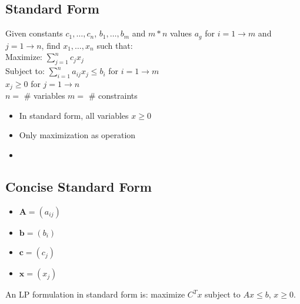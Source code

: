 \documentclass[12pt, letter]{article}
\begin{document}
\subsection*{Standard Form}
Given constants $c_1,\ldots,c_n$, $b_1,\ldots,b_m$ and $m*n$ values $a_g$ for $i=1\rightarrow m$ and $j=1\rightarrow n$, find $x_1,\ldots,x_n$ such that: \\
Maximize: $ \sum_{j=1}^{n} c_j x_j$ \\
Subject to: $ \sum_{i=1}^{n} a_{ij}x_j \le b_i$ for $i=1 \rightarrow m$ \\
 $x_j \ge 0$ for $j=1\rightarrow n$ \\
$n=$ \# variables
$m=$ \# constraints

\begin{itemize}
	\item In standard form, all variables $x \ge 0$
	\item Only maximization as operation
	\item 
\end{itemize}

\subsection*{Concise Standard Form}
\begin{itemize}
	\item $\bm{A} = (a_{ij})$
	\item $\bm{b} = (b_i)$ 
	\item $\bm{c} = (c_j)$
	\item $\bm{x} = (x_j)$
\end{itemize}
An LP formulation in standard form is: maximize $C^{T}x$ subject to $Ax \le b$,  $x \ge 0$.
\end{document}
